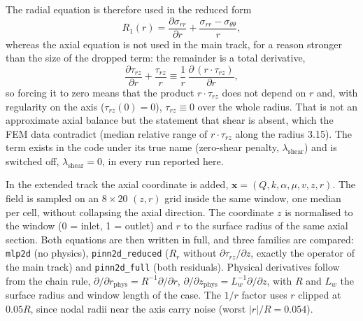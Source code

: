 \documentclass[subscriptcorrection,upint,varvw,barcolor=Goldenrod3,mathalfa=cal=euler,balance,hyphenate,french,pdf-a]{asmejour} %
\begin{document}
The radial equation is therefore used in the reduced form
\begin{equation}
  R_1(r) = \frac{\partial\sigma_{rr}}{\partial r}
         + \frac{\sigma_{rr}-\sigma_{\theta\theta}}{r},
  \label{eq:eq_red}
\end{equation}
whereas the axial equation is not used in the main track, for a reason stronger
than the size of the dropped term: the remainder is a total derivative,
\begin{equation}
  \frac{\partial\tau_{rz}}{\partial r} + \frac{\tau_{rz}}{r}
  \equiv \frac{1}{r}\,\frac{\partial\,(r\cdot\tau_{rz})}{\partial r},
  \label{eq:identity}
\end{equation}
so forcing it to zero means that the product $r\cdot\tau_{rz}$ does not depend on $r$ and, with regularity on
the axis ($\tau_{rz}(0)=0$), $\tau_{rz}\equiv0$ over the whole radius. That is not
an approximate axial balance but the statement that shear is absent, which the
FEM data contradict (median relative range of $r\cdot\tau_{rz}$ along the radius
3.15).
The term exists in the code under its true name (zero-shear penalty,
$\lambda_{\mathrm{shear}}$) and is switched off, $\lambda_{\mathrm{shear}}=0$, in
every run reported here.

In the extended track the axial coordinate is added,
$\mathbf{x}=(Q,k,\alpha,\mu,v,z,r)$. The field is sampled on an $8\times20$ $(z,r)$
grid inside the same window, one median per cell, without collapsing the axial
direction. The coordinate $z$ is normalised to the window (0 = inlet, 1 = outlet) and $r$ to the
surface radius of the same axial section.
Both equations are then written in full, and three families are compared:
\texttt{mlp2d} (no physics), \texttt{pinn2d\_reduced} ($R_r$ without
$\partial\tau_{rz}/\partial z$, exactly the operator of the main track) and
\texttt{pinn2d\_full} (both residuals).
Physical derivatives follow from the chain rule,
$\partial/\partial r_{\mathrm{phys}}=R^{-1}\partial/\partial r$,
$\partial/\partial z_{\mathrm{phys}}=L_w^{-1}\partial/\partial z$, with $R$ and $L_w$
the surface radius and window length of the case. The $1/r$ factor uses $r$
clipped at $0.05R$, since nodal radii near the axis carry noise (worst
$|r|/R=0.054$).
\end{document}
